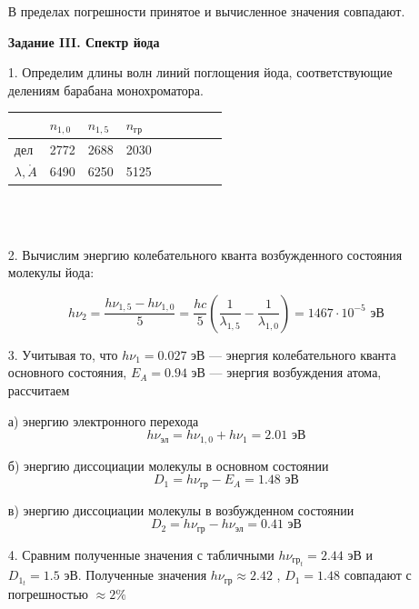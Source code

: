 \documentclass[12pt]{report}
\begin{document}
\begin{enumerate}
В пределах погрешности принятое и вычисленное значения совпадают.

\textbf{Задание III. Спектр йода}

\item[1.] Определим длины волн линий поглощения йода, соответствующие
делениям барабана монохроматора.

{
    \centering
    \begin{tabularx}{0.937\textwidth}{|X|X|X|X|X|X|X|X|X|}
        \hline
        & $n_{1,0}$ & $n_{1,5}$ & $n_\text{гр}$ \\
        \hline
        дел & 2772 & 2688 & 2030 \\
        \hline
        $\lambda, \mathring{A}$ & 6490 & 6250 & 5125 \\
        \hline
    \end{tabularx}
}
\\
\\

\item[2.] Вычислим энергию колебательного кванта возбужденного состояния
молекулы йода:

$$h\nu_2 = \frac{h\nu_{1,5} - h\nu_{1,0}}{5} = \frac{hc}{5} \left( \frac{1}{\lambda_{1,5}} - \frac{1}{\lambda_{1,0}} \right) = 1467 \cdot 10^{-5} \text{ эВ}$$

\item[3.] Учитывая то, что $h\nu_1 = 0.027$ эВ --- энергия колебательного кванта основного состояния, $E_A = 0.94$ эВ --- энергия возбуждения атома, рассчитаем

а) энергию электронного перехода
$$h\nu_\text{эл} = h\nu_{1,0} + h\nu_1 = 2.01 \text{ эВ}$$

б) энергию диссоциации молекулы в основном состоянии
$$D_1 = h\nu_\text{гр} - E_A = 1.48 \text{ эВ}$$

в) энергию диссоциации молекулы в возбужденном состоянии
$$D_2 = h\nu_\text{гр} - h\nu_\text{эл} = 0.41 \text{ эВ}$$

\item[4.] Сравним полученные значения с табличными $h\nu_{\text{гр}_{t}} = 2.44 \text{ эВ}$ и $D_{1_t} = 1.5 \text{ эВ}$. Полученные значения $h\nu_\text{гр} \approx 2.42$ , $D_1  = 1.48$ совпадают с погрешностью $\approx 2\%$


\end{enumerate}
\end{document}
